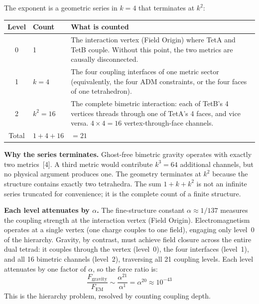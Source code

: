 \documentclass[11pt]{article}
\begin{document}
The exponent is a geometric series in $k = 4$ that terminates at $k^2$:

\begin{center}
\renewcommand{\arraystretch}{1.4}
\begin{tabular}{clp{8cm}}
\toprule
\textbf{Level} & \textbf{Count} & \textbf{What is counted} \\
\midrule
0 & 1 & The interaction vertex (Field Origin) where TetA and TetB couple. Without this point, the two metrics are causally disconnected. \\
1 & $k = 4$ & The four coupling interfaces of one metric sector (equivalently, the four ADM constraints, or the four faces of one tetrahedron). \\
2 & $k^2 = 16$ & The complete bimetric interaction: each of TetB's 4 vertices threads through one of TetA's 4 faces, and vice versa. $4 \times 4 = 16$ vertex-through-face channels. \\
\midrule
Total & $1 + 4 + 16$ & $= 21$ \\
\bottomrule
\end{tabular}
\end{center}

\textbf{Why the series terminates.}\quad
Ghost-free bimetric gravity operates with exactly two metrics~[4].
A third metric would contribute $k^3 = 64$ additional channels, but no physical argument produces one.
The geometry terminates at $k^2$ because the structure contains exactly two tetrahedra.
The sum $1 + k + k^2$ is not an infinite series truncated for convenience; it is the complete count of a finite structure.

\textbf{Each level attenuates by $\alpha$.}\quad
The fine-structure constant $\alpha \approx 1/137$ measures the coupling strength at the interaction vertex (Field Origin).
Electromagnetism operates at a single vertex (one charge couples to one field), engaging only level~0 of the hierarchy.
Gravity, by contrast, must achieve field closure across the entire dual tetrad: it couples through the vertex (level~0), the four interfaces (level~1), and all 16 bimetric channels (level~2), traversing all 21 coupling levels.
Each level attenuates by one factor of $\alpha$, so the force ratio is:
\begin{equation*}
\frac{F_{\text{gravity}}}{F_{\text{EM}}} \sim \frac{\alpha^{21}}{\alpha^{1}} = \alpha^{20} \approx 10^{-43}
\end{equation*}
This is the hierarchy problem, resolved by counting coupling depth.
\end{document}
